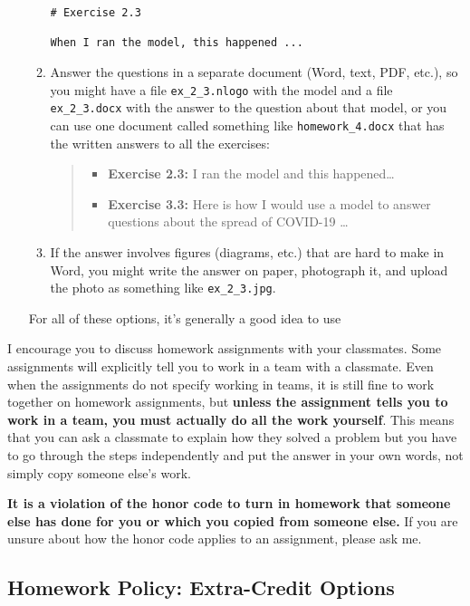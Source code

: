 \documentclass[
]{article}
\begin{document}
\begin{itemize}
\begin{enumerate}
\begin{verbatim}
# Exercise 2.3

When I ran the model, this happened ...
\end{verbatim}
  \item
    Answer the questions in a separate document (Word, text, PDF, etc.),
    so you might have a file \texttt{ex\_2\_3.nlogo} with the model and
    a file \texttt{ex\_2\_3.docx} with the answer to the question about
    that model, or you can use one document called something like
    \texttt{homework\_4.docx} that has the written answers to all the
    exercises:

    \begin{quote}
    \begin{itemize}
    \item
      \textbf{Exercise 2.3:} I ran the model and this happened\ldots{}
    \item
      \textbf{Exercise 3.3:} Here is how I would use a model to answer
      questions about the spread of COVID-19 \ldots{}
    \end{itemize}
    \end{quote}
  \item
    If the answer involves figures (diagrams, etc.) that are hard to
    make in Word, you might write the answer on paper, photograph it,
    and upload the photo as something like \texttt{ex\_2\_3.jpg}.
  \end{enumerate}

  For all of these options, it's generally a good idea to use
\end{itemize}

I encourage you to discuss homework assignments with your classmates.
Some assignments will explicitly tell you to work in a team with a
classmate. Even when the assignments do not specify working in teams, it
is still fine to work together on homework assignments, but
\textbf{unless the assignment tells you to work in a team, you must
actually do all the work yourself}. This means that you can ask a
classmate to explain how they solved a problem but you have to go
through the steps independently and put the answer in your own words,
not simply copy someone else's work.

\textbf{It is a violation of the honor code to turn in homework that
someone else has done for you or which you copied from someone else.} If
you are unsure about how the honor code applies to an assignment, please
ask me.

\subsection{Homework Policy: Extra-Credit
Options}\label{homework-policy-extra-credit-options}
\end{document}
